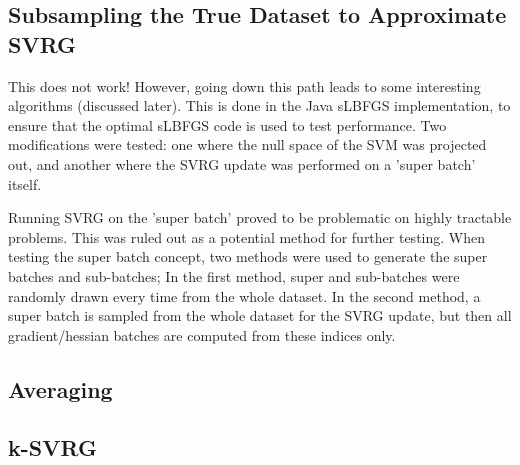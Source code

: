 \documentclass{article}
\begin{document}
\subsection{Subsampling the True Dataset to Approximate SVRG}
This does not work! However, going down this path leads to some interesting algorithms (discussed later).
This is done in the Java sLBFGS implementation, to ensure that the optimal sLBFGS code is used to test performance.
Two modifications were tested: one where the null space of the SVM was projected out, and another where the SVRG update was performed on a 'super batch' itself.

Running SVRG on the 'super batch' proved to be problematic on highly tractable problems. This was ruled out as a potential method for further testing.
When testing the super batch concept, two methods were used to generate the super batches and sub-batches; 
In the first method, super and sub-batches were randomly drawn every time from the whole dataset.
In the second method, a super batch is sampled from the whole dataset for the SVRG update, but then all gradient/hessian batches are computed from these indices only.
\subsection{Averaging}
\subsection{k-SVRG} 
\end{document}
